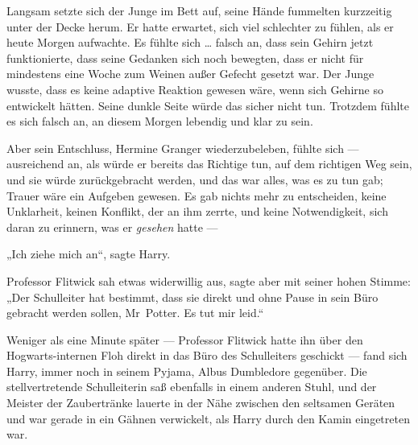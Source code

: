 Langsam setzte sich der Junge im Bett auf, seine Hände fummelten kurzzeitig unter der Decke herum. Er hatte erwartet, sich viel schlechter zu fühlen, als er heute Morgen aufwachte. Es fühlte sich … falsch an, dass sein Gehirn jetzt funktionierte, dass seine Gedanken sich noch bewegten, dass er nicht für mindestens eine Woche zum Weinen außer Gefecht gesetzt war. Der Junge wusste, dass es keine adaptive Reaktion gewesen wäre, wenn sich Gehirne so entwickelt hätten. Seine dunkle Seite würde das sicher nicht tun. Trotzdem fühlte es sich falsch an, an diesem Morgen lebendig und klar zu sein.

Aber sein Entschluss, Hermine Granger wiederzubeleben, fühlte sich — ausreichend an, als würde er bereits das Richtige tun, auf dem richtigen Weg sein, und sie würde zurückgebracht werden, und das war alles, was es zu tun gab; Trauer wäre ein Aufgeben gewesen. Es gab nichts mehr zu entscheiden, keine Unklarheit, keinen Konflikt, der an ihm zerrte, und keine Notwendigkeit, sich daran zu erinnern, was er \emph{gesehen} hatte —

„Ich ziehe mich an“, sagte Harry.

Professor Flitwick sah etwas widerwillig aus, sagte aber mit seiner hohen Stimme:
„Der Schulleiter hat bestimmt, dass sie direkt und ohne Pause in sein Büro gebracht werden sollen, Mr~Potter. Es tut mir leid.“

Weniger als eine Minute später — Professor Flitwick hatte ihn über den Hogwarts-internen Floh direkt in das Büro des Schulleiters geschickt — fand sich Harry, immer noch in seinem Pyjama, Albus Dumbledore gegenüber. Die stellvertretende Schulleiterin saß ebenfalls in einem anderen Stuhl, und der Meister der Zaubertränke lauerte in der Nähe zwischen den seltsamen Geräten und war gerade in ein Gähnen verwickelt, als Harry durch den Kamin eingetreten war.

